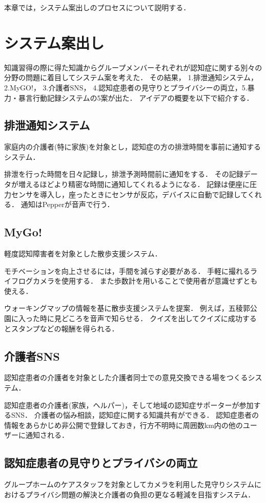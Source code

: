\documentclass[../report]{subfiles}
\begin{document}
本章では，システム案出しのプロセスについて説明する．

\section{システム案出し}
知識習得の際に得た知識からグループメンバーそれぞれが認知症に関する別々の分野の問題に着目してシステム案を考えた．
その結果， 1.排泄通知システム， 2.MyGO!， 3.介護者SNS， 4.認知症患者の見守りとプライバシーの両立，5.暴力・暴言行動記録システムの5案が出た．
アイデアの概要を以下で紹介する．

\subsection{排泄通知システム}
家庭内の介護者(特に家族)を対象とし，認知症の方の排泄時間を事前に通知するシステム．

排泄を行った時間を日々記録し，排泄予測時間前に通知をする．
その記録データが増えるほどより精密な時間に通知してくれるようになる．
記録は便座に圧力センサを導入し，座ったときにセンサが反応，デバイスに自動で記録してくれる．
通知はPepperが音声で行う．

\subsection{MyGo!}
軽度認知障害者を対象とした散歩支援システム．

モチベーションを向上させるには，手間を減らす必要がある．
手軽に撮れるライフログカメラを使用する．
また歩数計を用いることで使用者が意識せずとも使える．

ウォーキングマップの情報を基に散歩支援システムを提案．
例えば，五稜郭公園に入った時に見どころを音声で知らせる．
クイズを出してクイズに成功するとスタンプなどの報酬を得られる．

\subsection{介護者SNS}
認知症患者の介護者を対象とした介護者同士での意見交換できる場をつくるシステム．

認知症患者の介護者(家族，ヘルパー)，そして地域の認知症サポーターが参加するSNS．
介護者の悩み相談，認知症に関する知識共有ができる．
認知症患者の情報をあらかじめ非公開で登録しておき，行方不明時に周囲数km内の他のユーザーに通知される．

\subsection{認知症患者の見守りとプライバシの両立}
グループホームのケアスタッフを対象としてカメラを利用した見守りシステムにおけるプライバシ問題の解決と介護者の負担の更なる軽減を目指すシステム．
\end{document}
